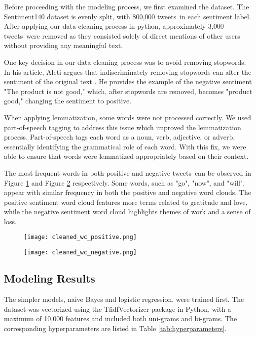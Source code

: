 \documentclass{article}
\newcommand{\tweets}{tweets}
\begin{document}
\begin{multicols}{2}
Before proceeding with the modeling process, we first examined the dataset. The Sentiment140 dataset is evenly split, with 800,000 \tweets\ in each sentiment label. After applying our data cleaning process in python, approximately 3,000 \tweets\ were removed as they consisted solely of direct mentions of other users without providing any meaningful text.

One key decision in our data cleaning process was to avoid removing stopwords. In his article, Aleti argues that indiscriminately removing stopwords can alter the sentiment of the original text \cite{aleti2020stopwords}. He provides the example of the negative sentiment "The product is not good," which, after stopwords are removed, becomes "product good," changing the sentiment to positive. 

When applying lemmatization, some words were not processed correctly. We used part-of-speech tagging to address this issue which improved the lemmatization process. Part-of-speech tags each word as a noun, verb, adjective, or adverb, essentially identifying the grammatical role of each word. With this fix, we were able to ensure that words were lemmatized appropriately based on their context.

The most frequent words in both positive and negative \tweets\ can be observed in Figure \ref{fig:pos_wc} and Figure \ref{fig:neg_wc} respectively. Some words, such as "go", "now", and "will", appear with similar frequency in both the positive and negative word clouds. The positive sentiment word cloud features more terms related to gratitude and love, while the negative sentiment word cloud highlights themes of work and a sense of loss.

\begin{figure}[H]
\centering
\texttt{[image: cleaned\_wc\_positive.png]}
\label{fig:pos_wc}
\end{figure}

\begin{figure}[H]
\centering
\texttt{[image: cleaned\_wc\_negative.png]}
\label{fig:neg_wc}
\end{figure}

\subsection{Modeling Results}

The simpler models, naive Bayes and logistic regression, were trained first. The dataset was vectorized using the TfidfVectorizer package in Python, with a maximum of 10,000 features and included both uni-grams and bi-grams. The corresponding hyperparameters are listed in Table \ref{tab:hyperparameters}. 


\end{multicols}
\end{document}
